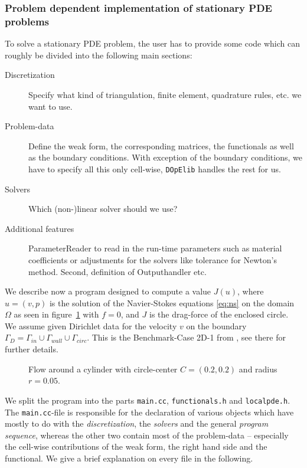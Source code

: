 \documentclass[prodmode,acmtoms]{acmsmall}
\numberwithin{equation}{section}
\newcommand{\dope}{\texttt{DOpElib}}
\begin{document}
\subsubsection{Problem dependent implementation of stationary PDE problems}
To solve a stationary PDE problem, the user has to provide some code which can roughly be divided into the following main sections:
\begin{description}
\item[Discretization] Specify what kind of triangulation,
finite element, quadrature rules, etc. we want to use.
\item[Problem-data] Define the weak form, the corresponding matrices, the functionals as well as the boundary conditions. With exception of the boundary conditions, we have to specify all this only cell-wise, \dope{} handles the rest for us.
\item[Solvers] Which (non-)linear solver should we use? 
\item[Additional features] ParameterReader to read in the run-time parameters
  such as material coefficients or adjustments for the solvers like tolerance
  for Newton's method. Second, definition of Outputhandler etc.
\end{description} 

We describe now a program designed to compute a value $J(u)$, where $u=(v,p)$ is the solution of the Navier-Stokes equations \eqref{eq:ns} on the domain $\Omega$ as seen in figure~\ref{fig:example_ns} with  $f=0$, and $J$ is the drag-force of the enclosed circle. We assume given Dirichlet data for the velocity $v$ on the boundary $\Gamma_{D}=\Gamma_{in}\cup\Gamma_{wall}\cup\Gamma_{circ}$. This is the Benchmark-Case 2D-1 from \cite{TuSchae96}, see there for further details.
\begin{figure}[h]
\centering
\resizebox{0.5\textwidth}{!}{}
\caption{Flow around a cylinder with 
circle-center $C=(0.2,0.2)$ and radius $r=0.05$.}
\label{fig:example_ns}
\end{figure}

We split the program into the parts \texttt{main.cc}, \texttt{functionals.h} and \texttt{localpde.h}. The \texttt{main.cc}-file is responsible for the declaration of various objects which have mostly to do with the \textit{discretization}, the \textit{solvers} and the general \textit{program sequence}, whereas the other two contain most of the problem-data -- especially the cell-wise contributions of the weak form, the right hand side and the functional. We give a brief explanation on every file in the following.
\end{document}
